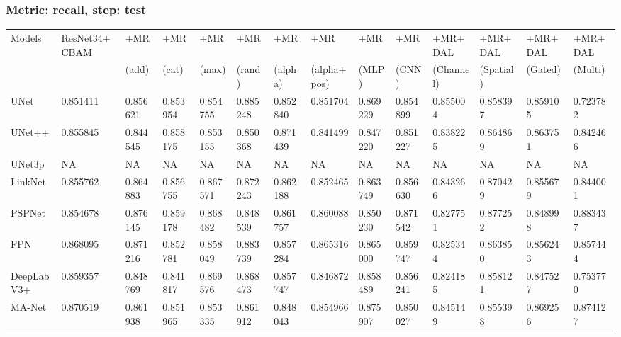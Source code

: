 \documentclass{article}
\begin{document}
\subsubsection{Metric: recall, step: test}
\begin{tabular}{llllllllllllll}
\toprule
Models & ResNet34+CBAM & +MR  & +MR  & +MR  & +MR  & +MR  & +MR  & +MR  & +MR  & +MR+DAL & +MR+DAL & +MR+DAL & +MR+DAL \\
       &             &  (add) &  (cat) &  (max) &  (rand) &  (alpha) &  (alpha+pos) &  (MLP) &  (CNN) & (Channel) & (Spatial) & (Gated) & (Multi) \\
\midrule
UNet & 0.851411 & 0.856621 & 0.853954 & 0.854755 & 0.885248 & 0.852840 & 0.851704 & 0.869229 & 0.854899 & 0.855004 & 0.858397 & 0.859105 & 0.723782 \\
UNet++ & 0.855845 & 0.844545 & 0.858175 & 0.853155 & 0.850368 & 0.871439 & 0.841499 & 0.847220 & 0.851227 & 0.838225 & 0.864869 & 0.863751 & 0.842466 \\
UNet3p & NA & NA & NA & NA & NA & NA & NA & NA & NA & NA & NA & NA & NA \\
LinkNet & 0.855762 & 0.864883 & 0.856755 & 0.867571 & 0.872243 & 0.862188 & 0.852465 & 0.863749 & 0.856630 & 0.843266 & 0.870429 & 0.855679 & 0.844001 \\
PSPNet & 0.854678 & 0.876145 & 0.859178 & 0.868482 & 0.848539 & 0.861757 & 0.860088 & 0.850230 & 0.871542 & 0.827751 & 0.877252 & 0.848998 & 0.883437 \\
FPN & 0.868095 & 0.871216 & 0.852781 & 0.858049 & 0.883739 & 0.857284 & 0.865316 & 0.865000 & 0.859747 & 0.825344 & 0.863850 & 0.856243 & 0.857444 \\
DeepLabV3+ & 0.859357 & 0.848769 & 0.841817 & 0.869576 & 0.868473 & 0.857747 & 0.846872 & 0.858489 & 0.856241 & 0.824185 & 0.858121 & 0.847527 & 0.753770 \\
MA-Net & 0.870519 & 0.861938 & 0.851965 & 0.853335 & 0.861912 & 0.848043 & 0.854966 & 0.875907 & 0.850027 & 0.845149 & 0.855398 & 0.869256 & 0.874127 \\
\bottomrule
\end{tabular}
\end{document}
